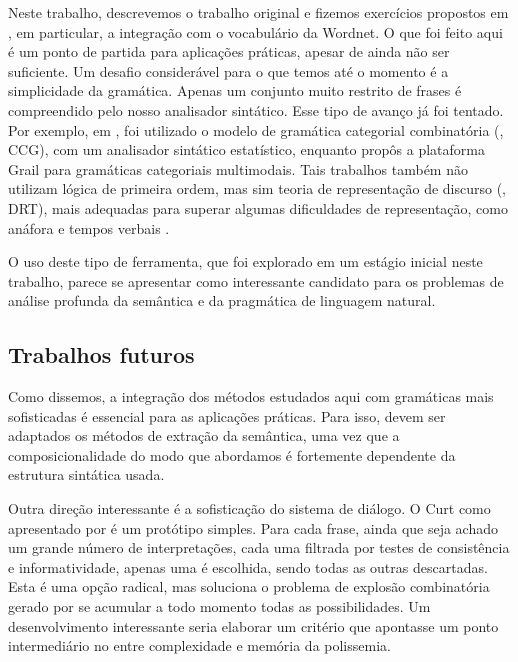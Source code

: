 
Neste trabalho, descrevemos o trabalho original e fizemos exercícios propostos em \cite{BlackburnBos:2005}, em particular, a integração com o vocabulário da Wordnet. O que foi feito aqui é um ponto de partida para aplicações práticas, apesar de ainda não ser suficiente. Um desafio considerável para o que temos até o momento é a simplicidade da gramática. Apenas um conjunto muito restrito de frases é compreendido pelo nosso analisador sintático. Esse tipo de avanço já foi tentado. Por exemplo, em \cite{BosMarkert2006}, foi utilizado o modelo de gramática categorial combinatória (, CCG), com um analisador sintático estatístico, enquanto \cite{Moot2010} propôs a plataforma Grail para gramáticas categoriais multimodais. Tais trabalhos também não utilizam lógica de primeira ordem, mas sim teoria de representação de discurso (, DRT), mais adequadas para superar algumas dificuldades de representação, como anáfora e tempos verbais \cite[p.~1]{Kamp:1993}.

O uso deste tipo de ferramenta, que foi explorado em um estágio inicial neste trabalho, parece se apresentar como interessante candidato para os problemas de análise profunda da semântica e da pragmática de linguagem natural.


\subsection{Trabalhos futuros}

  Como dissemos, a integração dos métodos estudados aqui com gramáticas mais sofisticadas é essencial para as aplicações práticas. Para isso, devem ser adaptados os métodos de extração da semântica, uma vez que a composicionalidade do modo que abordamos é fortemente dependente da estrutura sintática usada.
  
  Outra direção interessante é a sofisticação do sistema de diálogo. O Curt como apresentado por \citet{BlackburnBos:2005} é um protótipo simples. Para cada frase, ainda que seja achado um grande número de interpretações, cada uma filtrada por testes de consistência e informatividade, apenas uma é escolhida, sendo todas as outras descartadas. Esta é uma opção radical, mas soluciona o problema de explosão combinatória gerado por se acumular a todo momento todas as possibilidades. Um desenvolvimento interessante seria elaborar um critério que apontasse um ponto intermediário no  entre complexidade e memória da polissemia. %
  
